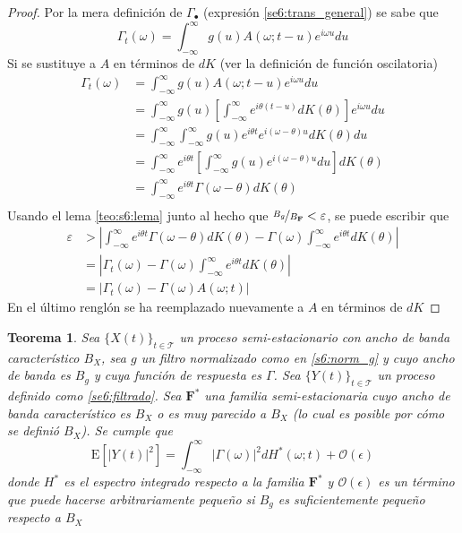 \documentclass[12pt,letterpaper]{book}
\newtheorem{teorema}{Teorema}[chapter]
\newcommand{\intR}{\int_{-\infty}^{\infty}}
\newcommand{\ef}{\mathbf{F}}
\newcommand{\efstar}{\ef^{\boldsymbol{*}}}
\newcommand{\E}[1]{\mathrm{E}\left[ #1 \right]}
\newcommand{\abso}[1]{\left| #1 \right|}
\newcommand{\xt}{$\{X(t)\}_{t\in \mathcal{T}}$ }
\newcommand{\orden}[1]{\mathcal{O}\left( #1 \right)}
\begin{document}
\begin{proof}
Por la mera definición de $\Gamma_\bullet$ (expresión \ref{se6:trans_general}) se sabe que
\begin{equation*}
\Gamma_t (\omega) = \intR g(u) A(\omega; t-u) e^{i \omega u} du
\end{equation*}
Si se sustituye a $A$ en términos de $dK$ (ver la definición de función oscilatoria)
\begin{align*}
\Gamma_t (\omega) &= \intR g(u) A(\omega; t-u) e^{i \omega u} du \\
&= 
\intR g(u) \left[ \intR e^{i \theta (t-u)} dK(\theta) \right] e^{i \omega u} du \\
&=
\intR \intR g(u) e^{i \theta t} e^{i (\omega- \theta) u} dK(\theta) du \\
&=
\intR e^{i \theta t} \left[ \intR g(u) e^{i (\omega- \theta) u} du \right] dK(\theta) \\
&=
\intR e^{i \theta t} \Gamma(\omega - \theta) dK(\theta) \\
\end{align*}
Usando el lema \ref{teo:s6:lema} junto al hecho que $\nicefrac{B_g}{B_\ef} < \varepsilon$, se puede escribir que
\begin{align*}
\varepsilon 
&> 
\abso{\intR e^{i \theta t} \Gamma(\omega - \theta) dK(\theta) - 
\Gamma(\omega) \intR e^{i \theta t} dK(\theta) } \\
&=
\abso{\Gamma_t (\omega) - 
\Gamma(\omega) \intR e^{i \theta t} dK(\theta) } \\
&=
\abso{\Gamma_t (\omega) - 
\Gamma(\omega) A(\omega; t) }
\end{align*}
En el último renglón se ha reemplazado nuevamente a $A$ en términos de $dK	$
\end{proof}

\begin{teorema}
Sea \xt un proceso semi-estacionario con ancho de banda característico $B_X$, sea $g$ un filtro normalizado como en \ref{s6:norm_g} y cuyo ancho de banda es $B_g$ y cuya función de respuesta es $\Gamma$. 
%
Sea $\{Y(t)\}_{t\in \mathcal{T}}$ un proceso definido como \ref{se6:filtrado}.
%
Sea $\efstar$ una familia semi-estacionaria cuyo ancho de banda característico es $B_X$ o es muy parecido a $B_X$ (lo cual es posible por cómo se definió $B_X$).
%
Se cumple que
\begin{equation}
\E{\abso{Y(t)}^{2}} = \intR \abso{\Gamma(\omega)}^{2} dH^{*}(\omega; t) + \orden{\epsilon}
\end{equation}
donde $H^{*}$ es el espectro integrado respecto a la familia $\efstar$ y $\orden{\epsilon}$ es un término que puede hacerse arbitrariamente pequeño si $B_g$ es suficientemente pequeño respecto a $B_X$
\label{teo:aprox_orden}
\end{teorema}
\end{document}
